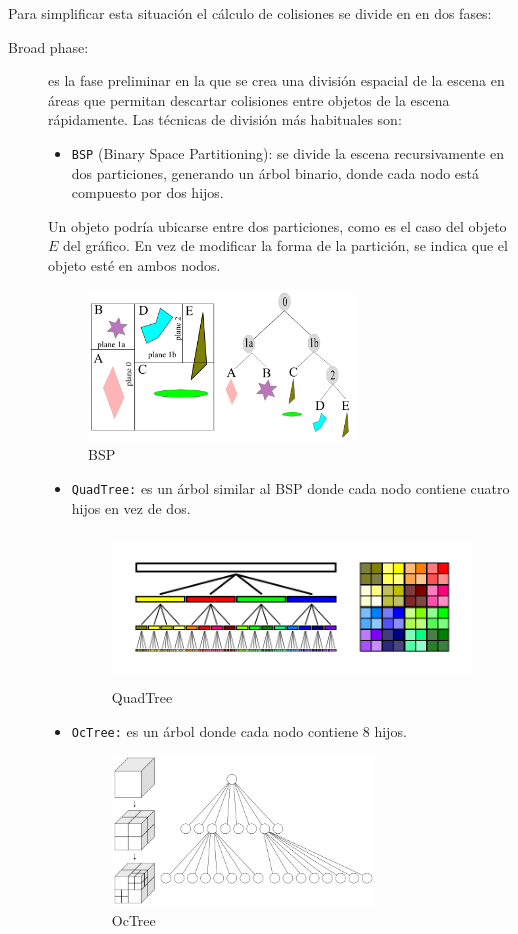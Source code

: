 Para simplificar esta situación el cálculo de colisiones se divide en en dos fases:
\begin{description}
\item [Broad phase:] es la fase preliminar en la que se crea una división espacial de la escena en áreas que permitan descartar colisiones entre objetos de la escena rápidamente. Las técnicas de división más habituales son:
\begin{itemize}
\item \texttt{BSP} (Binary Space Partitioning): se divide la escena recursivamente en dos particiones, generando un árbol binario, donde cada nodo está compuesto por dos hijos. 
\end{itemize}

Un objeto podría ubicarse entre dos particiones, como es el caso del objeto $E$ del gráfico. En vez de modificar la forma de la partición, se indica que el objeto esté en ambos nodos.
\begin{figure}[!h]
	\centering	
        \includegraphics[height=4cm]{img/bsp.png}
	\caption{BSP}
\end{figure}


\begin{itemize}
\item \texttt{QuadTree:} es un árbol similar al BSP donde cada nodo contiene cuatro hijos en vez de dos.
\begin{figure}[!h]
	\centering	
        \includegraphics[height=4cm]{img/quadtreecolour1.png}
	\caption{QuadTree}
\end{figure}

\item \texttt{OcTree:} es un árbol donde cada nodo contiene 8 hijos.
\begin{figure}[!h]
	\centering	
	\includegraphics[height=4cm]{img/octree.png}
	\caption{OcTree}
\end{figure}
\end{itemize}



\end{description}
